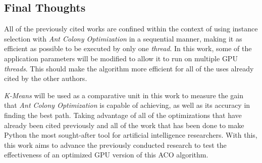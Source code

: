 \subsection{Final Thoughts}

All of the previously cited works are confined within the context of using instance selection with \emph{Ant Colony Optimization} in a sequential manner, making it as efficient as possible to be executed by only one \emph{thread}. In this work, some of the application parameters will be modified to allow it to run on multiple GPU \emph{threads}. This should make the algorithm more efficient for all of the uses already cited by the other authors.

\emph{K-Means} will be used as a comparative unit in this work to measure the gain that \emph{Ant Colony Optimization} is capable of achieving, as well as its accuracy in finding the best path. Taking advantage of all of the optimizations that have already been cited previously and all of the work that has been done to make Python the most sought-after tool for artificial intelligence researchers. With this, this work aims to advance the previously conducted research to test the effectiveness of an optimized GPU version of this ACO algorithm.
